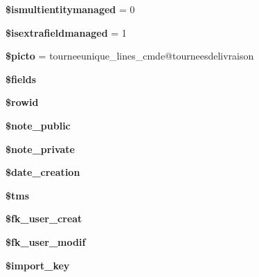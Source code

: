 \begin{DoxyCompactItemize}
{\bfseries \$ismultientitymanaged} = 0
\item 
\mbox{\label{classTourneeUnique__lines__cmde_a8519459ae25783f1761b92e8f0b082eb}} 
{\bfseries \$isextrafieldmanaged} = 1
\item 
\mbox{\label{classTourneeUnique__lines__cmde_a79f0baa1e3e27eb2bb21ac85e019cc21}} 
{\bfseries \$picto} = \textquotesingle{}tourneeunique\+\_\+lines\+\_\+cmde@tourneesdelivraison\textquotesingle{}
\item 
{\bfseries \$fields}
\item 
\mbox{\label{classTourneeUnique__lines__cmde_abe1dff227e0e09388ce59b48b062e486}} 
{\bfseries \$rowid}
\item 
\mbox{\label{classTourneeUnique__lines__cmde_af86adbc64f787904be4e904f8295d727}} 
{\bfseries \$note\+\_\+public}
\item 
\mbox{\label{classTourneeUnique__lines__cmde_a14f89e8efd3c38e34edb721acf1cab64}} 
{\bfseries \$note\+\_\+private}
\item 
\mbox{\label{classTourneeUnique__lines__cmde_a289a8e6f59ac90b894cefaeb4235bfeb}} 
{\bfseries \$date\+\_\+creation}
\item 
\mbox{\label{classTourneeUnique__lines__cmde_a71f7c0cf47828543bfe8f21011ab29a6}} 
{\bfseries \$tms}
\item 
\mbox{\label{classTourneeUnique__lines__cmde_af4c4ddc3954beeaa06098ac8f9b7a462}} 
{\bfseries \$fk\+\_\+user\+\_\+creat}
\item 
\mbox{\label{classTourneeUnique__lines__cmde_a8f18973d980eda669d6e97f78ed11184}} 
{\bfseries \$fk\+\_\+user\+\_\+modif}
\item 
\mbox{\label{classTourneeUnique__lines__cmde_a6081dbc0f28dd82082d553087102ed18}} 
{\bfseries \$import\+\_\+key}
\item 

\end{DoxyCompactItemize}
